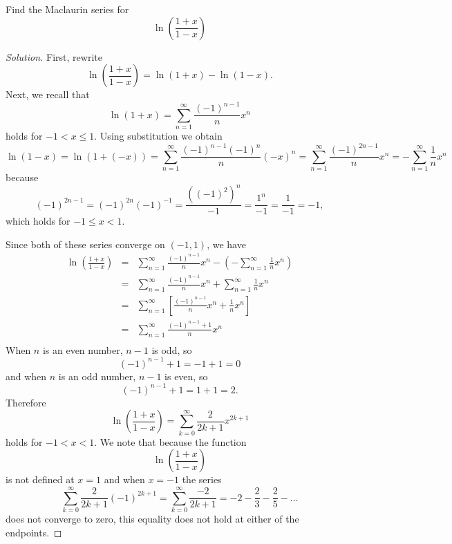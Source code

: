 \documentclass[12pt]{amsart}
\begin{document}
\begin{thm}[25 Points]
  Find the Maclaurin series for
  \[\ln\left(\frac{1 + x}{1 - x}\right)\]
\end{thm}

\begin{proof}[Solution]
  First, rewrite
  \[\ln\left(\frac{1+x}{1-x}\right) = \ln(1 + x) - \ln(1 - x).\]
  Next, we recall that
  \[\ln(1 + x) = \sum_{n = 1}^\infty \frac{(-1)^{n-1}}{n} x^n\]
  holds for \(-1 < x \leq 1\).
  Using substitution we obtain
  \[\ln(1 - x) = \ln(1 + (-x)) =
  \sum_{n = 1}^\infty \frac{(-1)^{n-1}(-1)^n}{n} (-x)^n
  = \sum_{n = 1}^\infty \frac{(-1)^{2n - 1}}{n} x^n
  = -\sum_{n = 1}^\infty \frac{1}{n} x^n\]
  because
  \[(-1)^{2n - 1} = (-1)^{2n}(-1)^{-1} = \frac{((-1)^2)^n}{-1} = \frac{1^n}{-1} = \frac{1}{-1} = -1,\]
  which holds for \(-1 \leq x < 1\).

  Since both of these series converge on \((-1,1)\), we have
  \begin{eqnarray*}
    \ln\left(\frac{1 + x}{1-x}\right) &=& \sum_{n = 1}^\infty \frac{(-1)^{n-1}}{n} x^n - \left(-\sum_{n = 1}^\infty \frac{1}{n} x^n\right)\\
    &=& \sum_{n = 1}^\infty \frac{(-1)^{n-1}}{n} x^n + \sum_{n = 1}^\infty \frac{1}{n} x^n\\
    &=& \sum_{n = 1}^\infty \left[\frac{(-1)^{n-1}}{n} x^n + \frac{1}{n} x^n\right]\\
    &=& \sum_{n = 1}^\infty \frac{(-1)^{n-1} +1}{n} x^n\\
  \end{eqnarray*}
  When \(n\) is an even number, \(n - 1\) is odd, so 
  \[(-1)^{n-1} + 1 = -1 + 1 = 0\]
  and when \(n\) is an odd number, \(n - 1\) is even, so
  \[(-1)^{n - 1} + 1 = 1 + 1 = 2.\]
  Therefore
  \[\ln\left(\frac{1 + x}{1 - x}\right) = \sum_{k=0}^\infty \frac{2}{2k+1} x^{2k+1}\]
  holds for \(-1 < x < 1\).
  We note that because the function
  \[\ln\left(\frac{1 + x}{1 - x}\right)\]
  is not defined at \(x = 1\) and when \(x = -1\) the series
  \[\sum_{k = 0}^\infty \frac{2}{2k + 1} (-1)^{2k + 1} = \sum_{k = 0}^\infty \frac{-2}{2k + 1} = -2 - \frac{2}{3} - \frac{2}{5} - \ldots\]
  does not converge to zero, this equality does not hold at either of the endpoints.
  
\end{proof}
\end{document}
